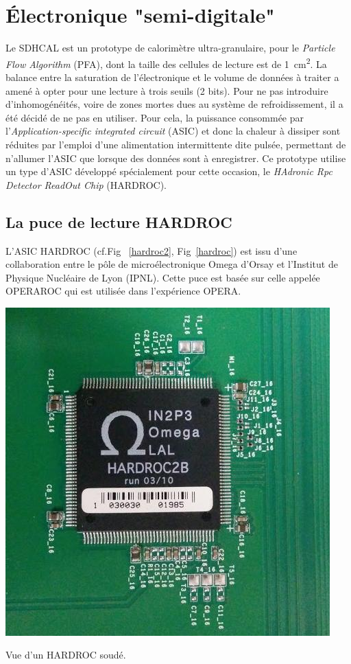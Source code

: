 \section{Électronique "semi-digitale"}
Le SDHCAL est un prototype de calorimètre ultra-granulaire, pour le \textit{Particle Flow Algorithm} (PFA), dont la taille des cellules de lecture est de \SI{1}{\square\centi\meter}. La balance entre la saturation de l'électronique et le volume de données à traiter a amené à opter pour une lecture à trois seuils (\num{2} bits). Pour ne pas introduire d'inhomogénéités, voire de zones mortes dues au système de refroidissement, il a été décidé de ne pas en utiliser. Pour cela, la puissance consommée par l'\textit{Application-specific integrated circuit} (ASIC) et donc la chaleur à dissiper sont réduites par l'emploi d'une alimentation intermittente dite pulsée, permettant de n'allumer l'ASIC que lorsque des données sont à enregistrer. Ce prototype utilise un type d'ASIC développé spécialement pour cette occasion, le \textit{HAdronic Rpc Detector ReadOut Chip }(HARDROC)\cite{Dulucq:2010ssa}.

\subsection{La puce de lecture HARDROC}
L'ASIC HARDROC (cf.Fig~ \ref{hardroc2}, Fig~\ref{hardroc}) est issu d'une collaboration entre le pôle de microélectronique Omega d'Orsay et l'Institut de Physique Nucléaire de Lyon (IPNL). Cette puce est basée sur celle appelée OPERAROC qui est utilisée dans l'expérience OPERA.

\marginpar
{
	\centering
	\includegraphics[width=\marginparwidth]{GLA/hardroc2.jpg}
	\captionsetup{type=figure}\caption{Vue d'un HARDROC soudé.}
	\label{hardroc2}
}

